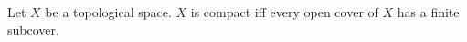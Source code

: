 
\begin{definition}\label{style_compact}
    Let $X$ be a topological space.
    $X$ is compact iff every open cover of $X$ has a finite subcover.
\end{definition}
